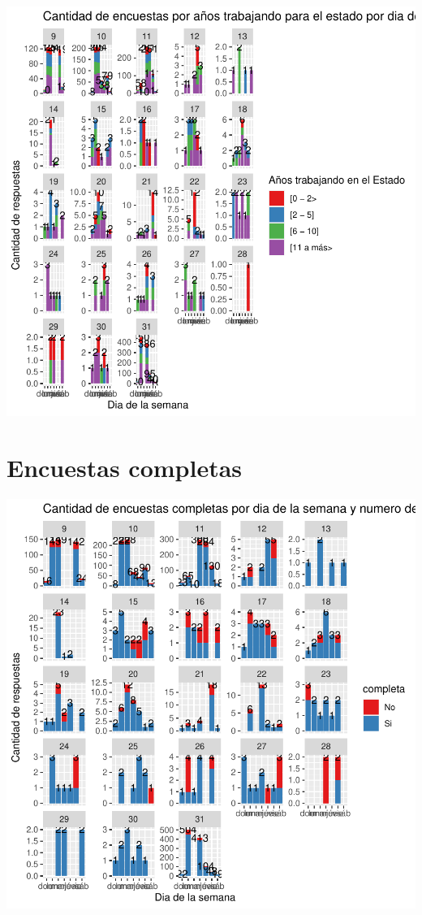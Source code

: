 \documentclass{article}
\begin{document}
\includegraphics{seguimientov5-038}

\section{Encuestas completas}

\includegraphics{seguimientov5-039}
\end{document}
